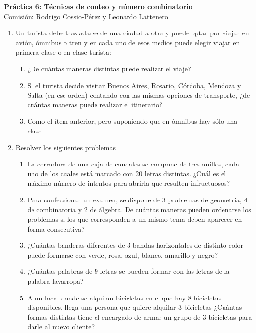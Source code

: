 \documentclass[a4paper]{article}
\newcommand{\exercise}{\item}
\begin{document}
\noindent \hrulefill 
\vspace{-7pt}
\begin{center} 
	\textbf{ Práctica 6: Técnicas de conteo y número combinatorio} \\
	Comisión: Rodrigo Cossio-Pérez y Leonardo Lattenero
\end{center}
\vspace{-10pt}
\hrulefill
\begin{enumerate}
	\exercise Un turista debe trasladarse de una ciudad a otra y puede optar por viajar en avión, ómnibus o tren y en cada uno de esos medios puede elegir viajar en primera clase o en clase turista:
	\begin{enumerate} [label=(\alph*)]
		\item ¿De cuántas maneras distintas puede realizar el viaje?
		\item Si el turista decide visitar Buenos Aires, Rosario, Córdoba, Mendoza y Salta (en ese orden) contando con las mismas opciones de transporte, ¿de cuántas maneras puede realizar el itinerario?
		\item Como el ítem anterior, pero suponiendo que en ómnibus hay sólo una clase
	\end{enumerate}
	\exercise Resolver los siguientes problemas %
	\begin{enumerate} [label=(\alph*)]
		\item La cerradura de una caja de caudales se compone de tres anillos, cada uno de los cuales está marcado con 20 letras distintas. ¿Cuál es el máximo número de intentos para abrirla que resulten infructuosos?
		\item Para confeccionar un examen, se dispone de 3 problemas de geometría, 4 de combinatoria y 2 de álgebra. De cuántas maneras pueden ordenarse los problemas si los que corresponden a un mismo tema deben aparecer en forma consecutiva?
		\item ¿Cuántas banderas diferentes de 3 bandas horizontales de distinto color puede formarse con verde, rosa, azul, blanco, amarillo y negro?
		\item ¿Cuántas palabras de 9 letras se pueden formar con las letras de la palabra lavarropa?
		\item A un local donde se alquilan bicicletas en el que hay 8 bicicletas disponibles, llega una persona que quiere alquilar 3 bicicletas ¿Cuántas formas distintas tiene el encargado de armar un grupo de 3 bicicletas para darle al nuevo cliente?

\end{enumerate}
\end{enumerate}
\end{document}
